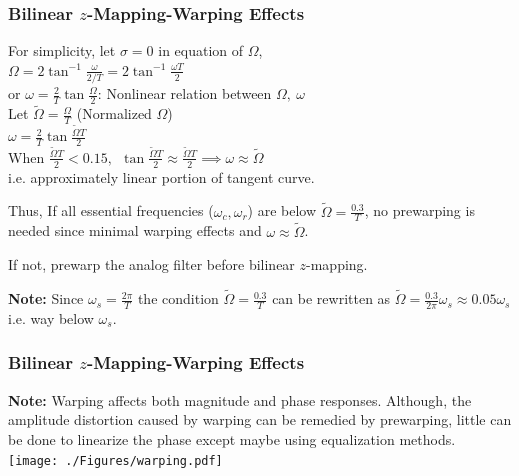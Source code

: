 \documentclass[mathserif, 10pt]{beamer} %
\begin{document}
\frame
{
\normalsize
\frametitle{Bilinear $z$-Mapping-Warping Effects}

For simplicity, let $\sigma = 0$ in equation of $\Omega$, \\ \vspace{.05in}
$\Omega = 2 \tan^{-1} \frac{\omega}{2/T} = 2 \tan^{-1} \frac{\omega T}{2}$\\ \vspace{.05in}
or $\omega = \frac{2}{T} \tan \frac{\Omega}{2}$:  Nonlinear relation between $\Omega, ~\omega$\\ \vspace{.1in}
Let $\tilde \Omega = \frac{\Omega}{T}$  (Normalized $\Omega$)\\ \vspace{.08in}
$\omega = \frac{2}{T} \tan \frac{\tilde \Omega T}{2}$\\ \vspace{.08in}
When $\frac{\tilde \Omega T}{2}<0.15,~~\tan \frac{\tilde \Omega T}{2} \approx \frac{\tilde \Omega T}{2} \implies \omega \approx \tilde \Omega$ \\ \vspace{.1in}
i.e.  approximately linear portion of tangent curve. \\ \vspace{.08in}

Thus, If all essential frequencies ($\omega_c, \omega_r$) are below $\tilde \Omega = \frac{0.3}{T}$, no prewarping is needed since minimal warping effects and $\omega \approx \tilde \Omega$. \vspace{.05in}

If not, prewarp the analog filter before bilinear $z$-mapping. \\ \vspace{.05in}


\textbf{Note: }Since $\omega_s=\frac{2 \pi}{T}$ the condition $\tilde \Omega = \frac{0.3}{T}$ can be rewritten as $\tilde \Omega = \frac{0.3}{2 \pi}\omega_s \approx 0.05 \omega_s$ i.e. way below $\omega_s$. 


}


\frame
{
\small
\frametitle{Bilinear $z$-Mapping-Warping Effects}
\textbf{Note: }Warping affects both magnitude and phase responses.  Although, the amplitude distortion caused by warping can be remedied by prewarping, little can be done to linearize the phase except maybe using equalization methods. \\

\texttt{[image: ./Figures/warping.pdf]}


}
\end{document}
